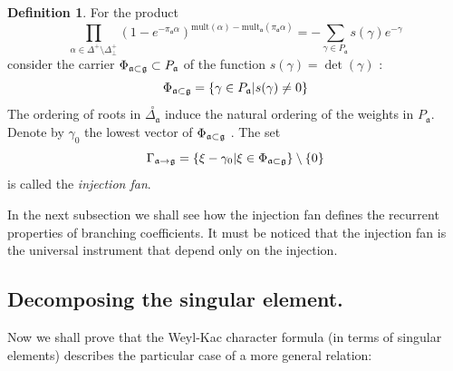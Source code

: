\documentclass[12pt]{iopart}
\theoremstyle{definition}
\newtheorem{definition}{Definition}
\newcommand{\co}[1]{\stackrel{\circ }{#1}}
\newcommand{\af}{\mathfrak{a}}
\begin{document}
\begin{definition}
\label{fan-definition} For the product
\begin{equation}
\prod_{\alpha \in \Delta ^{+}\setminus \Delta _{\bot }^{+}}\left( 1-e^{-\pi
_{\af}\alpha }\right) ^{\mathrm{mult}(\alpha )-\mathrm{mult}_{\af%
}(\pi _{\af}\alpha )}=-\sum_{\gamma \in P_{\af}}s(\gamma
)e^{-\gamma }  \label{eq:6}
\end{equation}
consider the carrier $\Phi _{\af\subset \frak{g}}\subset P_{\af}$
of the function $s(\gamma )=\det \left( \gamma \right) $ :
\begin{equation}
\Phi _{\af\subset \frak{g}}=\left\{ \gamma \in P_{\af}|s(\gamma
)\neq 0\right\}   \label{eq:37}
\end{equation}
The ordering of roots in $\co{\Delta _{\af}}$ induce the
natural ordering of the weights in $P_{\af}$. Denote by $\gamma _{0}$
the lowest vector of $\Phi _{\af\subset \frak{g}}$ . The set
\begin{equation}
\Gamma _{\af\rightarrow \frak{g}}=\left\{ \xi -\gamma _{0}|\xi \in \Phi _{%
\af\subset \frak{g}}\right\} \setminus \left\{ 0\right\}
\label{fan-defined}
\end{equation}
is called the \textit{injection fan}.
\end{definition}
In the next subsection we shall see how the injection fan defines the recurrent
properties of branching coefficients. It must be noticed that the injection fan is
the universal instrument that depend only on the injection.

\subsection{Decomposing the singular element.}
\label{subsec:decomp-sing-element}

Now we shall prove that the Weyl-Kac character formula (in terms of singular
elements) describes the particular case of a more general relation:
\end{document}
